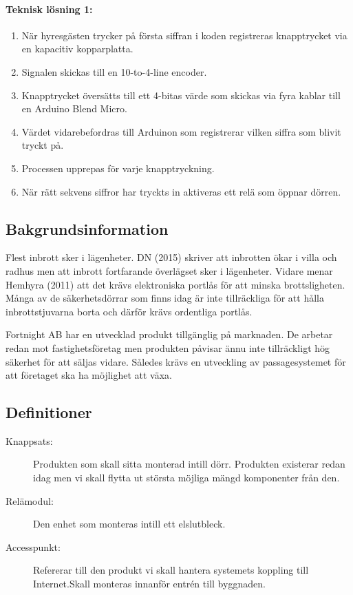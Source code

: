 \documentclass[twocolumn]{article}
\begin{document}
\paragraph{Teknisk lösning 1:} 
\begin{enumerate}
    \item När hyresgästen trycker på första siffran i koden registreras knapptrycket via en kapacitiv kopparplatta.
    \item Signalen skickas till en 10-to-4-line encoder.
    \item Knapptrycket översätts till ett 4-bitas värde som skickas via fyra kablar till en Arduino Blend Micro.
    \item Värdet vidarebefordras till Arduinon som registrerar vilken siffra som blivit tryckt på.
    \item Processen upprepas för varje knapptryckning.
    \item När rätt sekvens siffror har tryckts in aktiveras ett relä som öppnar dörren.

\end{enumerate} 

\subsection{Bakgrundsinformation}
 
Flest inbrott sker i lägenheter. DN (2015)\cite{dn_inbrott} skriver att inbrotten ökar i villa och radhus men att inbrott fortfarande överlägset sker i lägenheter. Vidare menar Hemhyra (2011)\cite{hemhyra_inbrott} att det krävs elektroniska portlås för att minska brottsligheten. Många av de säkerhetsdörrar som finns idag är inte tillräckliga för att hålla inbrottstjuvarna borta och därför krävs ordentliga portlås.

Fortnight AB har en utvecklad produkt tillgänglig på marknaden. De arbetar redan mot fastighetsföretag men produkten påvisar ännu inte tillräckligt hög säkerhet för att säljas vidare. Således krävs en utveckling av passagesystemet för att företaget ska ha möjlighet att växa. 

\subsection{Definitioner}
\begin{description}
    \item[Knappsats:] Produkten som skall sitta monterad intill dörr. Produkten existerar redan idag men vi skall flytta ut största möjliga mängd komponenter från den.
    \item[Relämodul:] Den enhet som monteras intill ett elslutbleck.
    \item[Accesspunkt:] Refererar till den produkt vi skall hantera systemets koppling till Internet.Skall monteras innanför entrén till byggnaden.
\end{description}
\end{document}
